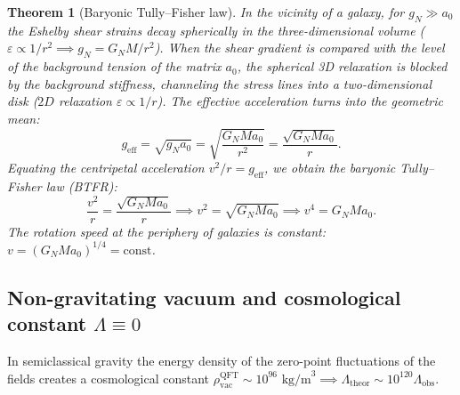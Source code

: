 \documentclass[11pt,a4paper]{article}
\newtheorem{theorem}{Theorem}
\theoremstyle{definition}
\theoremstyle{remark}
\begin{document}
\begin{theorem}[Baryonic Tully--Fisher law]
\label{thm:tully_fisher_derivation}
In the vicinity of a galaxy, for $g_N \gg a_0$ the Eshelby shear strains decay spherically in the three-dimensional volume ($\varepsilon \propto 1/r^2 \implies g_N = G_N M / r^2$). When the shear gradient is compared with the level of the background tension of the matrix $a_0$, the spherical 3D relaxation is blocked by the background stiffness, channeling the stress lines into a two-dimensional disk ($2D$ relaxation $\varepsilon \propto 1/r$). The effective acceleration turns into the geometric mean:
\begin{equation}
	g_{\mathrm{eff}} = \sqrt{g_N a_0} = \sqrt{\frac{G_N M a_0}{r^2}} = \frac{\sqrt{G_N M a_0}}{r}.
\end{equation}
Equating the centripetal acceleration $v^2 / r = g_{\mathrm{eff}}$, we obtain the baryonic Tully--Fisher law (BTFR):
\begin{equation}
	\frac{v^2}{r} = \frac{\sqrt{G_N M a_0}}{r} \implies v^2 = \sqrt{G_N M a_0} \implies v^4 = G_N M a_0.
	\label{eq:btfr_exact}
\end{equation}
The rotation speed at the periphery of galaxies is constant: $v = (G_N M a_0)^{1/4} = \text{const}$.
\end{theorem}

\subsection{Non-gravitating vacuum and cosmological constant $\Lambda \equiv 0$}

In semiclassical gravity the energy density of the zero-point fluctuations of the fields creates a cosmological constant $\rho_{\mathrm{vac}}^{\mathrm{QFT}} \sim 10^{96}\text{ kg/m}^3 \implies \Lambda_{\mathrm{theor}} \sim 10^{120} \Lambda_{\mathrm{obs}}$.
\end{document}
